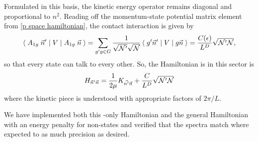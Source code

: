Formulated in this basis, the kinetic energy operator remains diagonal and proportional to $n^2$.
Reading off the momentum-state potential matrix element from \eqref{p space hamiltonian}, the contact interaction is given by
\begin{equation}
    \left\langle\;A_{1g}\; \vec{n}'\;\middle|\;V\;\middle|\;A_{1g}\; \vec{n}\;\right\rangle
    =
    \sum_{g'g \in G}
        \frac{1}{\sqrt{\mathcal{N}'}\sqrt{\mathcal{N}}} \left\langle\;g'\vec{n}'\;\middle|\;V\;\middle|\;g\vec{n}\;\right\rangle
    =
    \frac{C(\epsilon)}{L^D} \sqrt{\mathcal{N}'\mathcal{N}},
\end{equation}
so that every \Aoneg state can talk to every other.
So, the Hamiltonian is in this sector is
\begin{equation}
    H_{\vec{n}'\vec{n}} = \frac{1}{2\mu} K_{\vec{n'}\vec{n}} + \frac{C}{L^D} \sqrt{\mathcal{N}'\mathcal{N}}
\end{equation}
where the kinetic piece is understood with appropriate factors of $2\pi/L$.

We have implemented both this \Aoneg-only Hamiltonian and the general Hamiltonian with an energy penalty for non-\Aoneg states and verified that the spectra match where expected to as much precision as desired.
